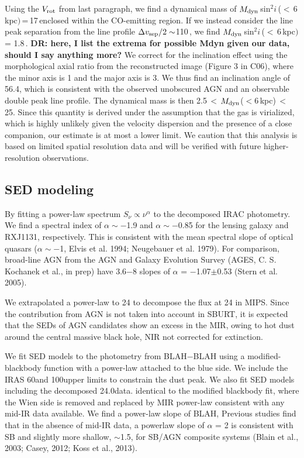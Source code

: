 \documentclass[]{emulateapj}
\begin{document}
Using the $V_{\rm rot}$ from last paragraph, we find a dynamical mass of
$M_{\rm dyn}$\,sin$^2 i$\,($<$\,6\,kpc$)$\,=\,17\,\Msun enclosed
within the CO-emitting region. If we instead consider the
line peak separation from the
\bco line profile $\Delta v_{\rm sep}/2 \sim$110\,\kms, we find
$M_{\rm dyn}$\,sin$^2 i$\,($<$\,6\,kpc$)$ = 1.8\,\Msun.
{\bf DR: here, I list the extrema for possible Mdyn given our data,
should I say anything more?}
We correct for the inclination effect using the
morphological axial ratio from the reconstructed image (Figure 3 in C06), where
the minor axis is 1 and the major axis is 3.
We thus find an inclination angle of 56.4\degr, which is consistent with the
observed unobscured AGN and an observable double peak line profile.
The dynamical mass is then
2.5\Msun\,$<$\,$M_{\rm dyn}$($<$6\,kpc)\,$<$\,25\Msun.
Since this quantity is derived under the assumption that the gas is
virialized, which is highly unlikely given the velocity dispersion and the
presence of a close companion, our estimate is
at most a lower limit. We caution that this analysis is
based on limited spatial
resolution data and will be verified with future higher-resolution
observations.

\subsection{SED modeling} \label{sec:SED}
By fitting a power-law spectrum $S_\nu \propto \nu^\alpha$ to the decomposed
IRAC photometry. We find a spectral index of $\alpha\sim-$1.9 and
$\alpha\sim-$0.85 for the lensing galaxy and RXJ1131, respectively.
This is consistent with the mean spectral slope of optical quasars
($\alpha\sim-$1, Elvis et al. 1994; Neugebauer et al. 1979).
For comparison, broad-line AGN from the AGN and Galaxy
Evolution Survey (AGES, C. S. Kochanek et al., in prep) have 3.6$-$8
\micron slopes of $\alpha$ = $-$1.07$\pm$0.53 (Stern et al. 2005).

We extrapolated a power-law to 24 \micron to decompose the flux
at 24 \micron in MIPS.
Since the contribution from AGN is not taken into account in SBURT, it is expected that the SEDs of AGN candidates show an excess in the MIR, owing to hot dust around the central massive black hole,
NIR not corrected for extinction.

We fit SED models to the photometry from BLAH$-$BLAH \micron
using a modified-blackbody function
with a power-law attached to the blue side.
We include
the IRAS 60\micron and 100\micron upper limits
to constrain the dust peak. We also fit SED models
including the decomposed 24.0\micron data.
identical to the modified blackbody fit,
where the Wien side is removed and replaced by MIR power-law consistent with any mid-IR data available.
We find a power-law slope of BLAH,
Previous studies find that in the absence of mid-IR data, a powerlaw slope of $\alpha$ = 2 is consistent with SB and slightly more shallow, $\sim$1.5, for SB/AGN composite systems (Blain et al., 2003; Casey, 2012; Koss et al., 2013).
\end{document}
